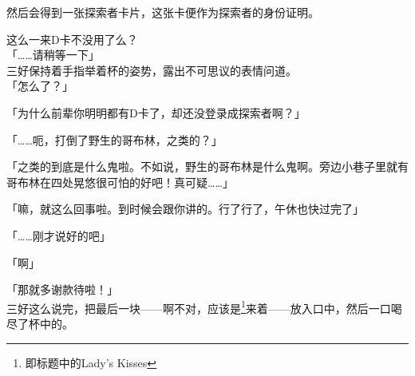 然后会得到一张探索者卡片，这张卡便作为探索者的身份证明。

这么一来D卡不没用了么？\\

「……请稍等一下」\\

三好保持着手指举着杯的姿势，露出不可思议的表情问道。\\

「怎么了？」

「为什么前辈你明明都有D卡了，却还没登录成探索者啊？」

「……呃，打倒了野生的哥布林，之类的？」

「之类的到底是什么鬼啦。不如说，野生的哥布林是什么鬼啊。旁边小巷子里就有哥布林在四处晃悠很可怕的好吧！真可疑……」

「嘛，就这么回事啦。到时候会跟你讲的。行了行了，午休也快过完了」

「……刚才说好的吧」

「啊」

「那就多谢款待啦！」\\

三好这么说完，把最后一块——啊不对，应该是\footnote{即标题中的Lady's Kisses}来着——放入口中，然后一口喝尽了杯中的。\\

